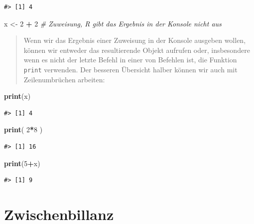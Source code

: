 \documentclass[]{book}
\newenvironment{Shaded}{\begin{snugshade}}{\end{snugshade}}
\newcommand{\KeywordTok}[1]{\textcolor[rgb]{0.13,0.29,0.53}{\textbf{#1}}}
\newcommand{\DecValTok}[1]{\textcolor[rgb]{0.00,0.00,0.81}{#1}}
\newcommand{\StringTok}[1]{\textcolor[rgb]{0.31,0.60,0.02}{#1}}
\newcommand{\CommentTok}[1]{\textcolor[rgb]{0.56,0.35,0.01}{\textit{#1}}}
\newcommand{\OperatorTok}[1]{\textcolor[rgb]{0.81,0.36,0.00}{\textbf{#1}}}
\newcommand{\NormalTok}[1]{#1}
\begin{document}
\begin{verbatim}
#> [1] 4
\end{verbatim}

\begin{Shaded}
\begin{Highlighting}[]
\NormalTok{x <-}\StringTok{ }\DecValTok{2} \OperatorTok{+}\StringTok{ }\DecValTok{2} \CommentTok{# Zuweisung, R gibt das Ergebnis in der Konsole nicht aus}
\end{Highlighting}
\end{Shaded}

\begin{quote}
Wenn wir das Ergebnis einer Zuweisung in der Konsole ausgeben wollen,
können wir entweder das resultierende Objekt aufrufen oder, insbesondere
wenn es nicht der letzte Befehl in einer von Befehlen ist, die Funktion
\texttt{print} verwenden. Der besseren Übersicht halber können wir auch
mit Zeilenumbrüchen arbeiten:
\end{quote}

\begin{Shaded}
\begin{Highlighting}[]
\KeywordTok{print}\NormalTok{(x)}
\end{Highlighting}
\end{Shaded}

\begin{verbatim}
#> [1] 4
\end{verbatim}

\begin{Shaded}
\begin{Highlighting}[]
\KeywordTok{print}\NormalTok{(}
  \DecValTok{2}\OperatorTok{*}\DecValTok{8}
\NormalTok{  )}
\end{Highlighting}
\end{Shaded}

\begin{verbatim}
#> [1] 16
\end{verbatim}

\begin{Shaded}
\begin{Highlighting}[]
\KeywordTok{print}\NormalTok{(}\DecValTok{5}\OperatorTok{+}\NormalTok{x)}
\end{Highlighting}
\end{Shaded}

\begin{verbatim}
#> [1] 9
\end{verbatim}

\section{Zwischenbillanz}\label{zwischenbillanz}
\end{document}
